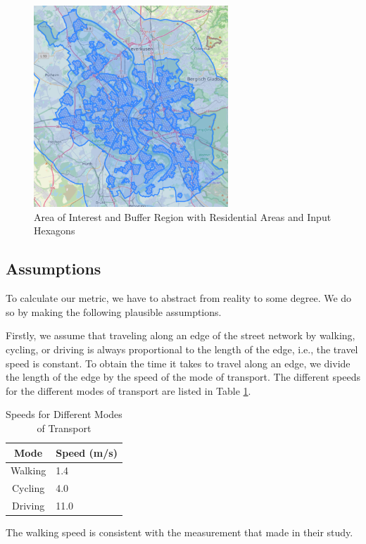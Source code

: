 \begin{figure}
  \begin{center}
    \includegraphics[width=0.65\textwidth]{Figures/experiment/input_hexagons_residential_areas.png}
  \end{center}
  \caption{Area of Interest and Buffer Region with Residential Areas and Input Hexagons}
  \label{fig:input_hexagons_residential_areas}
\end{figure}


\subsection{Assumptions}
\label{subs:assumptions}

To calculate our metric, we have to abstract from reality to some degree.
We do so by making the following plausible assumptions.
 
Firstly, we assume that traveling along an edge of the street network by walking, cycling, or driving is always proportional to the length of the edge, i.e., the travel speed is constant.
To obtain the time it takes to travel along an edge, we divide the length of the edge by the speed of the mode of transport.
The different speeds for the different modes of transport are listed in Table \ref{table:speeds}.
\begin{table}[h]
\centering
\caption{Speeds for Different Modes of Transport}
\label{table:speeds}
\begin{tabular}{|c|l|}
\hline
\textbf{Mode} & \textbf{Speed (m/s)} \\
\hline
Walking & 1.4 \\
\hline
Cycling & 4.0 \\
\hline
Driving & 11.0 \\
\hline
\end{tabular}
\end{table}
The walking speed is consistent with the measurement that  made in their study.

